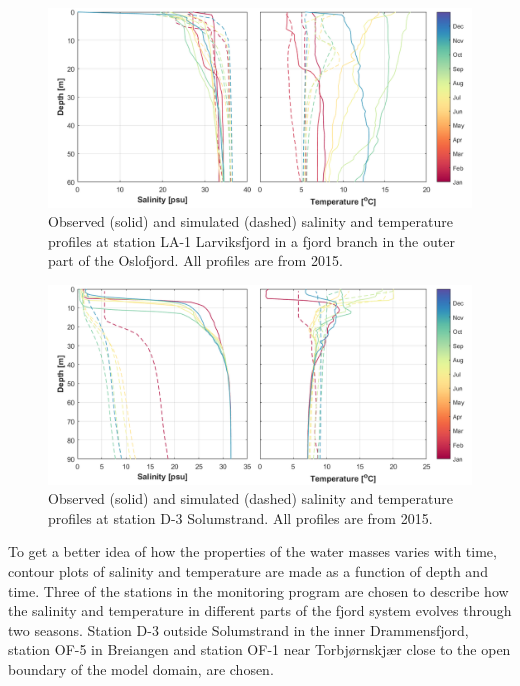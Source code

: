 \begin{figure}[tbh]
\centerline{
\includegraphics*[trim=0cm 0cm 0cm 0cm,clip=true,width=\textwidth]{Figurer/CTD_LA-1}}
\caption{\small
Observed (solid) and simulated (dashed) salinity and temperature profiles at station LA-1 Larviksfjord in a fjord branch in the outer part of the Oslofjord. All profiles are from 2015.}
\label{fig:CTD_LA-1}
\end{figure}

\begin{figure}[tbh]
\centerline{
\includegraphics*[trim=0cm 0cm 0cm 0cm,clip=true,width=\textwidth]{Figurer/CTD_D-3}}
\caption{\small
Observed (solid) and simulated (dashed) salinity and temperature profiles at station D-3 Solumstrand. All profiles are from 2015.}
\label{fig:CTD_D-3}
\end{figure}

To get a better idea of how the properties of the water masses varies with time, contour plots of salinity and temperature are made as a function of depth and time.
Three of the stations in the monitoring program are chosen to describe how the salinity and temperature in different parts of the fjord system evolves through two seasons. Station D-3 outside Solumstrand in the inner Drammensfjord, station OF-5 in Breiangen and station OF-1 near Torbj{\o}rnskj{\ae}r close to the open boundary of the model domain, are chosen.

